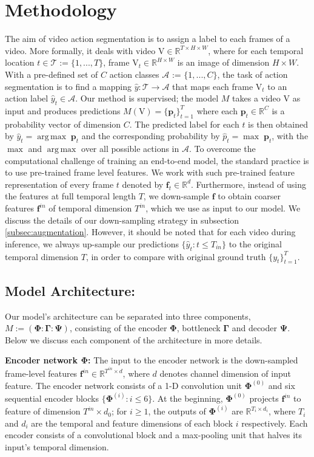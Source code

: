 \documentclass[10pt,twocolumn,letterpaper]{article}
\DeclareMathOperator{\argmax}{\arg\,\max}
\newcommand{\calA}{\mathcal{A}}
\newcommand{\calT}{\mathcal{T}}
\newcommand{\bbR}{\mathbb{R}}
\newcommand{\bp}{\mathbf{p}}
\newcommand{\feat}{\mathbf{f}}
\newcommand{\vid}{\ensuremath{\text{V}}}
\newcommand{\enc}{\ensuremath{\mathbf{\Phi}}}
\newcommand{\dec}{\ensuremath{\mathbf{\Psi}}}
\newcommand{\bottle}{\ensuremath{\mathbf{\Gamma}}}
\newcommand{\finp}{\ensuremath{\feat^{in}}}
\begin{document}
\section{Methodology}\label{sec:method}

The aim of video action segmentation is to assign a label to each frames of a video. More formally, it deals with video $\text{V} \in \bbR^{T \times H\times W}$, where for each temporal location $t \in \calT := \{1,...,T\}$, frame $\vid_t \in \bbR^{H\times W}$ is an image of dimension $H\times W$. With a pre-defined set of $C$ action classes $\calA$ := $\{1,...,C\}$, the task of action segmentation is to find a mapping $\hat{y}: \calT \to \calA$ that maps each frame $\vid_t$ to an action label $\hat{y}_t \in \calA$.
Our method is supervised; the model $M$ takes a video $\vid$ as input and produces predictions $M(\vid) = \{\bp_t\}^{T}_{t=1}$ where each $\bp_t \in \bbR^C$ is a probability vector of dimension $C$. The predicted label for each $t$ is then obtained by $\hat{y}_t = \argmax \;\bp_t$ and the corresponding probability by $\hat{p}_t = \max \; \bp_t$, with the $\max$ and $\argmax$ over all possible actions in $\calA$. To overcome the computational challenge of training an end-to-end model, the standard practice is to use pre-trained frame level features. We work with such pre-trained feature representation of every frame $t$ denoted by $\feat_t \in \bbR^d$. Furthermore, instead of using the features at full temporal length $T$, we down-sample $\feat$ to obtain coarser features $\feat^{in}$ of temporal dimension $T^{in}$, which we use as input to our model. We discuss the details of our down-sampling strategy in subsection \ref{subsec:augmentation}.  However, it should be noted that for each video during inference, we always up-sample our predictions $\{\hat{y}_t: t \le T_{in}\}$ to the original temporal dimension $T$, in order to compare with original ground truth $\{y_t\}^T_{t=1}$. 

\subsection{Model Architecture:}\label{subsec:model_architec}
Our model's architecture can be separated into three components, \ie $M := (\enc:\bottle:\dec)$, consisting of the encoder \enc{}, bottleneck \bottle{} and decoder \dec{}. Below we discuss each component of the architecture in more details.

\textbf{Encoder network \enc:} The input to the encoder network is the down-sampled frame-level features $\finp \in \bbR^{T^{in}\times d}$, where $d$ denotes channel dimension of input feature. The encoder network consists of a 1-D convolution unit $\enc^{(0)}$ and six sequential encoder blocks $\{\enc^{(i)}\!:\! i\!\le\!6\}$. At the beginning, $\enc^{(0)}$ projects \finp{} to feature of dimension $T^{in} \times d_0$;
for $i\!\ge\!1$, the outputs of $\enc^{(i)}$ are $\bbR^{T_i \times d_i}$, where $T_i$ and $d_i$ are the temporal and feature dimensions of each block $i$ respectively. Each encoder consists of a convolutional block and a max-pooling unit that halves its input's temporal dimension.
\end{document}

